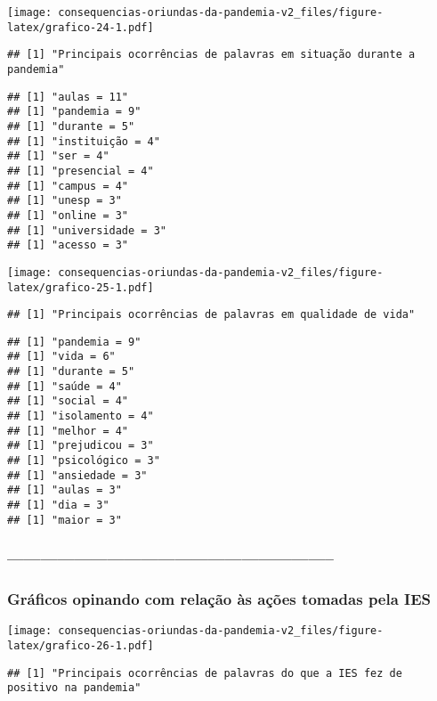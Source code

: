\documentclass[
]{article}
\begin{document}
\texttt{[image: consequencias-oriundas-da-pandemia-v2\_files/figure-latex/grafico-24-1.pdf]}

\begin{verbatim}
## [1] "Principais ocorrências de palavras em situação durante a pandemia"
\end{verbatim}

\begin{verbatim}
## [1] "aulas = 11"
## [1] "pandemia = 9"
## [1] "durante = 5"
## [1] "instituição = 4"
## [1] "ser = 4"
## [1] "presencial = 4"
## [1] "campus = 4"
## [1] "unesp = 3"
## [1] "online = 3"
## [1] "universidade = 3"
## [1] "acesso = 3"
\end{verbatim}

\texttt{[image: consequencias-oriundas-da-pandemia-v2\_files/figure-latex/grafico-25-1.pdf]}

\begin{verbatim}
## [1] "Principais ocorrências de palavras em qualidade de vida"
\end{verbatim}

\begin{verbatim}
## [1] "pandemia = 9"
## [1] "vida = 6"
## [1] "durante = 5"
## [1] "saúde = 4"
## [1] "social = 4"
## [1] "isolamento = 4"
## [1] "melhor = 4"
## [1] "prejudicou = 3"
## [1] "psicológico = 3"
## [1] "ansiedade = 3"
## [1] "aulas = 3"
## [1] "dia = 3"
## [1] "maior = 3"
\end{verbatim}

\hypertarget{section}{%
\subsubsection{-----------------------------------------------------------}\label{section}}

\hypertarget{gruxe1ficos-opinando-com-relauxe7uxe3o-uxe0s-auxe7uxf5es-tomadas-pela-ies}{%
\subsubsection{Gráficos opinando com relação às ações tomadas pela
IES}\label{gruxe1ficos-opinando-com-relauxe7uxe3o-uxe0s-auxe7uxf5es-tomadas-pela-ies}}

\texttt{[image: consequencias-oriundas-da-pandemia-v2\_files/figure-latex/grafico-26-1.pdf]}

\begin{verbatim}
## [1] "Principais ocorrências de palavras do que a IES fez de positivo na pandemia"
\end{verbatim}
\end{document}
